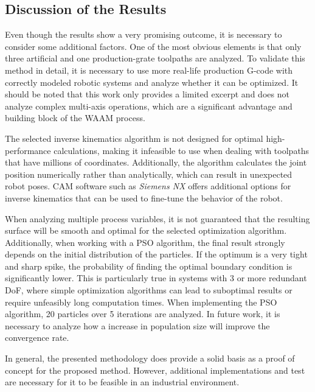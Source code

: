 







\subsection{Discussion of the Results}%


Even though the results show a very promising outcome, it is necessary to consider some additional factors. One of the most obvious elements is that only three artificial and one production-grate toolpaths are analyzed. To validate this method in detail, it is necessary to use more real-life production G-code with correctly modeled robotic systems and analyze whether it can be optimized. It should be noted that this work only provides a limited excerpt and does not analyze complex multi-axis operations, which are a significant advantage and building block of the \acrshort{WAAM} process.

The selected inverse kinematics algorithm is not designed for optimal high-performance calculations, making it infeasible to use when dealing with toolpaths that have millions of coordinates. Additionally, the algorithm calculates the joint position numerically rather than analytically, which can result in unexpected robot poses. \acrshort{CAM} software such as \textit{Siemens NX} offers additional options for inverse kinematics that can be used to fine-tune the behavior of the robot.

When analyzing multiple process variables, it is not guaranteed that the resulting surface will be smooth and optimal for the selected optimization algorithm. Additionally, when working with a \acrshort{PSO} algorithm, the final result strongly depends on the initial distribution of the particles. If the optimum is a very tight and sharp spike, the probability of finding the optimal boundary condition is significantly lower. This is particularly true in systems with 3 or more redundant \acrshort{DoF}, where simple optimization algorithms can lead to suboptimal results or require unfeasibly long computation times. When implementing the \acrshort{PSO} algorithm, 20 particles over 5 iterations are analyzed. In future work, it is necessary to analyze how a increase in population size will improve the convergence rate. 

In general, the presented methodology does provide a solid basis as a proof of concept for the proposed method. However, additional implementations and test are necessary for it to be feasible in an industrial environment.
